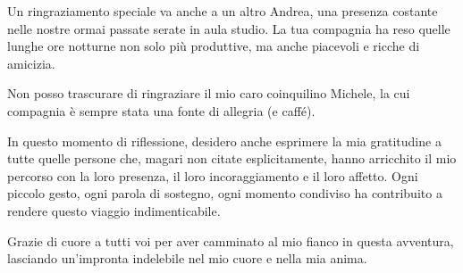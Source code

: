 Un ringraziamento speciale va anche a un altro Andrea, una presenza costante nelle nostre ormai passate serate in aula studio. La tua compagnia ha reso quelle lunghe ore notturne non solo più produttive, ma anche piacevoli e ricche di amicizia.

Non posso trascurare di ringraziare il mio caro coinquilino Michele, la cui compagnia è sempre stata una fonte di allegria (e caffé).

In questo momento di riflessione, desidero anche esprimere la mia gratitudine a tutte quelle persone che, magari non citate esplicitamente, hanno arricchito il mio percorso con la loro presenza, il loro incoraggiamento e il loro affetto. Ogni piccolo gesto, ogni parola di sostegno, ogni momento condiviso ha contribuito a rendere questo viaggio indimenticabile.

Grazie di cuore a tutti voi per aver camminato al mio fianco in questa avventura, lasciando un'impronta indelebile nel mio cuore e nella mia anima.

